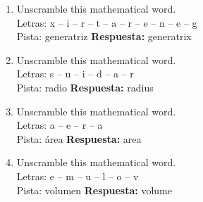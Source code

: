 \documentclass[11pt,a4paper]{article}
\begin{document}
\begin{enumerate}
\textbf{Respuesta:} cone
\item Unscramble this mathematical word.\\Letras: x -- i -- r -- t -- a -- r -- e -- n -- e -- g\\Pista: generatriz
\textbf{Respuesta:} generatrix
\item Unscramble this mathematical word.\\Letras: s -- u -- i -- d -- a -- r\\Pista: radio
\textbf{Respuesta:} radius
\item Unscramble this mathematical word.\\Letras: a -- e -- r -- a\\Pista: área
\textbf{Respuesta:} area
\item Unscramble this mathematical word.\\Letras: e -- m -- u -- l -- o -- v\\Pista: volumen
\textbf{Respuesta:} volume
\end{enumerate}
\end{document}

